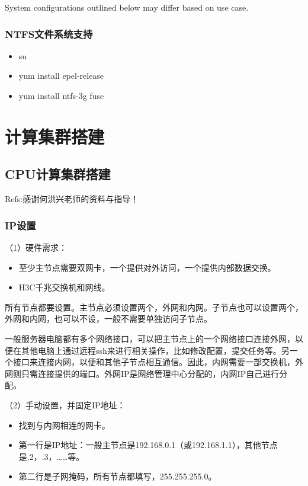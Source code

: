 {System configurations outlined below may differ based on use case.


\section{NTFS文件系统支持}
\begin{itemize}
\item su
\item yum install epel-release
\item yum install ntfs-3g fuse
\end{itemize}






\part{计算集群搭建}
\chapter{CPU计算集群搭建}
Refs:感谢何洪兴老师的资料与指导！
\section{IP设置}
（1）硬件需求：
\begin{itemize}
\item 至少主节点需要双网卡，一个提供对外访问，一个提供内部数据交换。
\item H3C千兆交换机和网线。
\end{itemize}


所有节点都要设置。主节点必须设置两个，外网和内网。子节点也可以设置两个，外网和内网，也可以不设，一般不需要单独访问子节点。

一般服务器电脑都有多个网络接口，可以把主节点上的一个网络接口连接外网，以便在其他电脑上通过远程ssh来进行相关操作，比如修改配置，提交任务等。另一个接口来连接内网，以便和其他子节点相互通信。因此，内网需要一部交换机，外网则只需连接提供的端口。外网IP是网络管理中心分配的，内网IP自己进行分配。

（2）手动设置，并固定IP地址：
\begin{itemize}
\item 找到与内网相连的网卡。

\item 第一行是IP地址：一般主节点是192.168.0.1（或192.168.1.1），其他节点是.2，.3，……等。

\item 第二行是子网掩码，所有节点都填写，255.255.255.0。


\end{itemize}}
